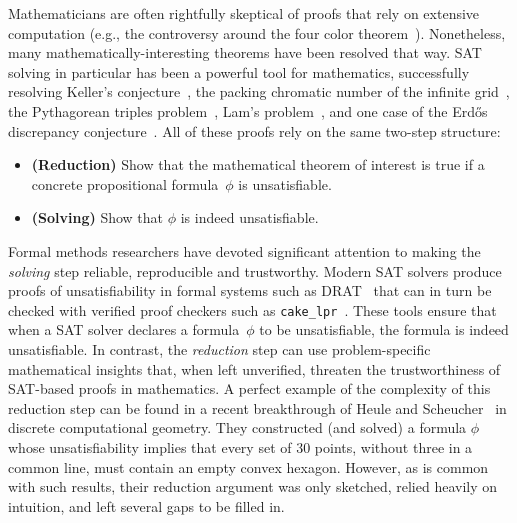 Mathematicians are often rightfully skeptical of proofs that rely on extensive computation (e.g., the controversy around the four color theorem~\cite{Walters2004ItAT}).
Nonetheless, many mathematically-interesting theorems have been resolved that way.
SAT solving in particular has been a powerful tool for mathematics, successfully resolving
Keller's conjecture~\cite{brakensiek2023resolution},
the packing chromatic number of the infinite grid~\cite{Subercaseaux_Heule_2023},
the Pythagorean triples problem~\cite{Heule_2016},
Lam's problem~\cite{21bright_sat_based_resolution_lams_problem},
and one case of the Erd\H{o}s discrepancy conjecture~\cite{konev2014sat}.
All of these proofs rely on the same two-step structure:
\begin{itemize}
\item \textbf{(Reduction)} Show that the mathematical theorem of interest is true if a concrete propositional formula~$\phi$ is unsatisfiable.
\item \textbf{(Solving)} Show that $\phi$ is indeed unsatisfiable.
\end{itemize}


Formal methods researchers have devoted significant attention to making the \emph{solving} step reliable, reproducible and trustworthy.
Modern SAT solvers produce proofs of unsatisfiability in formal systems
such as DRAT~\cite{drat-trim14}
that can in turn be checked with verified proof checkers
such as \texttt{cake\_lpr}~\cite{tanVerifiedPropagationRedundancy2023}. 
These tools ensure that when a SAT solver declares a formula~$\phi$ to be unsatisfiable, the formula is indeed unsatisfiable.
In contrast, the \emph{reduction} step can use problem-specific mathematical insights that, when left unverified, threaten the trustworthiness of SAT-based proofs in mathematics. 
A perfect example of the complexity of this reduction step can be found in a recent breakthrough of Heule and Scheucher~\cite{emptyHexagonNumber} in discrete computational geometry. 
They constructed (and solved) a formula $\phi$ whose unsatisfiability implies that every set of 30 points, without three in a common line, must contain an empty convex hexagon.
However, as is common with such results, their reduction argument was only sketched, relied heavily on intuition,
and left several gaps to be filled in.
 

